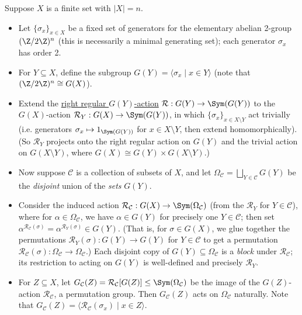 \begin{example}\label{eg:blaha_elem_technical_construction}
    Suppose $X$ is a finite set with $|X| = n$.
    \begin{itemize}
        \item Let $\{\sigma_x\}_{x \in X}$ be a fixed set of generators for the elementary abelian 2-group $(\Z/2\Z)^n$ (this is necessarily a minimal generating set); each generator $\sigma_x$ has order 2.
        \item For $Y \subseteq X$, define the subgroup $G(Y) = \langle \sigma_x \mid x \in Y \rangle$ (note that $(\Z/2\Z)^n \cong G(X)$).
        \item Extend the \hyperref[eg:right_regular_action]{right regular $G(Y)$-action} $\mathcal{R} : G(Y) \to \Sym(G(Y))$ to the $G(X)$-action $\mathcal{R}_Y : G(X) \to \Sym(G(Y))$, in which $\{\sigma_x\}_{x \in X \setminus Y}$ act trivially (i.e. generators $\sigma_x \mapsto 1_{\Sym(G(Y))}$ for $x \in X \setminus Y$, then extend homomorphically). (So $\mathcal{R}_Y$ projects onto the right regular action on $G(Y)$ and the trivial action on $G(X \setminus Y)$, where $G(X) \cong G(Y) \times G(X \setminus Y)$.)
        \item Now suppose $\mathcal{C}$ is a collection of subsets of $X$, and let $\Omega_\mathcal{C} = \bigsqcup_{Y \in \mathcal{C}} G(Y)$ be the \textit{disjoint} union of the \textit{sets} $G(Y)$.
        \item Consider the induced action $\mathcal{R}_\mathcal{C} : G(X) \to \Sym(\Omega_\mathcal{C})$ (from the $\mathcal{R}_Y$ for $Y \in \mathcal{C}$), where for $\alpha \in \Omega_\mathcal{C}$, we have $\alpha \in G(Y)$ for precisely one $Y \in \mathcal{C}$; then set $\alpha^{\mathcal{R}_\mathcal{C}(\sigma)} = \alpha^{\mathcal{R}_Y(\sigma)} \in G(Y)$. (That is, for $\sigma \in G(X)$, we glue together the permutations $\mathcal{R}_Y(\sigma) : G(Y) \to G(Y)$ for $Y \in \mathcal{C}$ to get a permutation $\mathcal{R}_\mathcal{C}(\sigma) : \Omega_\mathcal{C} \to \Omega_\mathcal{C}$.) Each disjoint copy of $G(Y) \subseteq \Omega_\mathcal{C}$ is a \textit{block} under $\mathcal{R}_\mathcal{C}$; its restriction to acting on $G(Y)$ is well-defined and precisely $\mathcal{R}_Y$.
        \item For $Z \subseteq X$, let $G_\mathcal{C}(Z) = \mathcal{R}_\mathcal{C}[G(Z)] \leq \Sym(\Omega_\mathcal{C})$ be the image of the $G(Z)$-action $\mathcal{R}_\mathcal{C}$, a permutation group. Then $G_\mathcal{C}(Z)$ acts on $\Omega_\mathcal{C}$ naturally. Note that $G_\mathcal{C}(Z) = \langle \mathcal{R}_\mathcal{C}(\sigma_x) \mid x \in Z \rangle$.
    \end{itemize}
\end{example}

